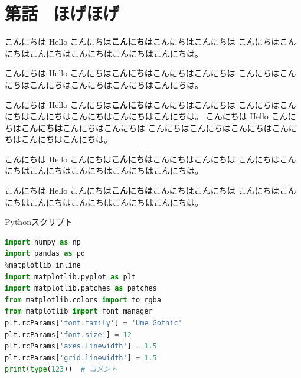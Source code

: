 \documentclass[b5paper,xelatex,ja=standard,11pt]{bxjsarticle}
\begin{document}
\begin{spacing}{1.1}\textbf{\tableofcontents}\end{spacing}

\renewcommand*{\mysectiontitle}{第{\themycounter}話 \, ほげほげ}
\section*{\mysectiontitle}\addcontentsline{toc}{section}{\mysectiontitle}

\begin{SERIFU1}[enlarge top by=3pt]
こんにちは Hello こんにちは{\bf こんにちは}こんにちはこんにちは
こんにちはこんにちはこんにちはこんにちはこんにちはこんにちは。
\end{SERIFU1}

\begin{SERIFU2}
こんにちは Hello こんにちは{\bf こんにちは}こんにちはこんにちは
こんにちはこんにちはこんにちはこんにちはこんにちはこんにちは。
\end{SERIFU2}

\begin{SERIFU1}
こんにちは Hello こんにちは{\bf こんにちは}こんにちはこんにちは
こんにちはこんにちはこんにちはこんにちはこんにちはこんにちは。
こんにちは Hello こんにちは{\bf こんにちは}こんにちはこんにちは
こんにちはこんにちはこんにちはこんにちはこんにちはこんにちは。
\end{SERIFU1}

\begin{SERIFU2}[enlarge bottom by=2pt]
こんにちは Hello こんにちは{\bf こんにちは}こんにちはこんにちは
こんにちはこんにちはこんにちはこんにちはこんにちはこんにちは。
\end{SERIFU2}

こんにちは Hello こんにちは{\bf こんにちは}こんにちはこんにちは
こんにちはこんにちはこんにちはこんにちはこんにちはこんにちは。

\begin{CODE}{Pythonスクリプト}
\begin{lstlisting}[language=python]
import numpy as np
import pandas as pd
%matplotlib inline  
import matplotlib.pyplot as plt
import matplotlib.patches as patches
from matplotlib.colors import to_rgba
from matplotlib import font_manager
plt.rcParams['font.family'] = 'Ume Gothic'
plt.rcParams['font.size'] = 12
plt.rcParams['axes.linewidth'] = 1.5
plt.rcParams['grid.linewidth'] = 1.5
print(type(123))  # コメント
\end{lstlisting}
\end{CODE}
\end{document}
